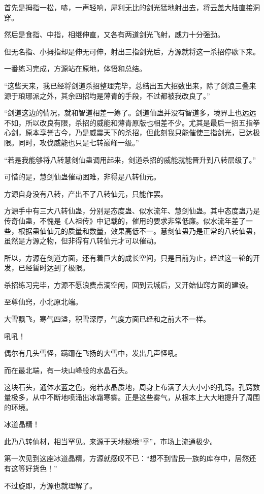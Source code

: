 \begin{this_body}
首先是拇指一松，哧，一声轻响，犀利无比的剑光猛地射出去，将云盖大陆直接洞穿。

然后是食指、中指，相继伸直，又各有两道剑光飞射，威力十分强劲。

但无名指、小拇指却是伸无可伸，射出三指剑光后，方源就将这一杀招停歇下来。

一番练习完成，方源站在原地，体悟和总结。

“这些天来，我已经将剑道杀招整理完毕，总结出五大招数出来，除了剑浪三叠来源于琅琊派之外，其余四招均是薄青的手段，不过都被我改良了。”

“剑道这边的情况，就和智道相差一筹了。剑道仙蛊并没有智道多，境界上也远远不如，所以改良有限，杀招的威能和薄青原版也相差不少。尤其是最后一招五指拳心剑，原本享誉古今，乃是威震天下的杀招，但此刻我只能催使三指剑光，已达极限。同时，攻伐威能也只是七转巅峰一级。”

“若是我能够将八转慧剑仙蛊调用起来，剑道杀招的威能就能晋升到八转层级了。”

可惜的是，慧剑仙蛊催动困难，非得是八转仙元。

方源自身没有八转，产出不了八转仙元，只能作罢。

方源手中有三大八转仙蛊，分别是态度蛊、似水流年、慧剑仙蛊。其中态度蛊乃是传奇仙蛊，不愧是《人祖传》中记载的，催用的要求非常低廉。似水流年差了一些，根据蛊仙仙元的质量和数量，效果高低不一。慧剑仙蛊乃是正常的八转仙蛊，虽然是方源之物，但非得有八转仙元才可以催动。

所以，方源在剑道方面，还有着巨大的成长空间，只是目前为止，经过这一轮的开发，已经暂时达到了极限。

杀招练习完毕，方源不愿浪费点滴空闲，回到云城后，又开始仙窍方面的建设。

至尊仙窍，小北原北端。

大雪飘飞，寒气四溢，积雪深厚，气度方面已经和之前大不一样。

吼吼！

偶尔有几头雪怪，蹒跚在飞扬的大雪中，发出几声怪吼。

而在最北端，有一块山峰般的水晶石头。

这块石头，通体水蓝之色，宛若水晶质地，周身上布满了大大小小的孔窍。孔窍数量极多，从中不断地喷涌出冰霜寒雾。正是这些雾气，从根本上大大地提升了周围的环境。

冰道晶精！

此乃八转仙材，相当罕见。来源于天地秘境“乎”，市场上流通极少。

第一次见到这座冰道晶精，方源就感叹不已：“想不到雪民一族的库存中，居然还有这等好货色！”

不过旋即，方源也就理解了。


\end{this_body}
